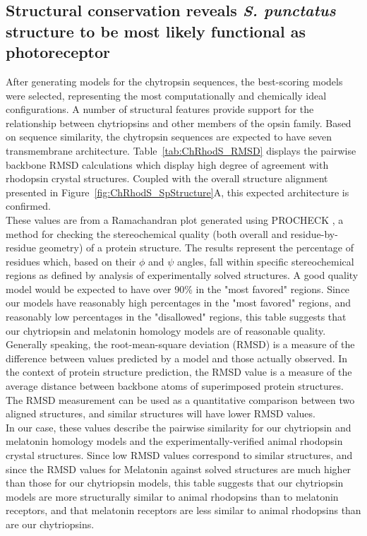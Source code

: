 \subsection*{Structural conservation reveals \textit{S. punctatus} structure to be most likely functional as photoreceptor}
\indent After generating models for the chytropsin sequences, the best-scoring models were selected, representing the most computationally and chemically ideal configurations. A number of structural features provide support for the relationship between chytriopsins and other members of the opsin family. Based on sequence similarity, the chytropsin sequences are expected to have seven transmembrane architecture. Table~\ref{tab:ChRhodS_RMSD} displays the pairwise backbone RMSD calculations which display high degree of agreement with rhodopsin crystal structures. Coupled with the overall structure alignment presented in Figure~\ref{fig:ChRhodS_SpStructure}A, this expected architecture is confirmed. \\
\indent These values are from a Ramachandran plot \cite{Ramachandran1963} generated using PROCHECK \cite{Laskowski1993}, a method for checking the stereochemical quality (both overall and residue-by-residue geometry) of a protein structure. The results represent the percentage of residues which, based on their $\phi$ and $\psi$ angles, fall within specific stereochemical regions as defined by analysis of experimentally solved structures. A good quality model would be expected to have over 90\% in the "most favored" regions. Since our models have reasonably high percentages in the "most favored" regions, and reasonably low percentages in the "disallowed" regions, this table suggests that our chytriopsin and melatonin homology models are of reasonable quality.\\
\indent Generally speaking, the root-mean-square deviation (RMSD) is a measure of the difference between values predicted by a model and those actually observed. In the context of protein structure prediction, the RMSD value is a measure of the average distance between backbone atoms of superimposed protein structures. The RMSD measurement can be used as a quantitative comparison between two aligned structures, and similar structures will have lower RMSD values. \\
\indent In our case, these values describe the pairwise similarity for our chytriopsin and melatonin homology models and the experimentally-verified animal rhodopsin crystal structures. Since low RMSD values correspond to similar structures, and since the RMSD values for Melatonin against solved structures are much higher than those for our chytriopsin models, this table suggests that our chytriopsin models are more structurally similar to animal rhodopsins than to melatonin receptors, and that melatonin receptors are less similar to animal rhodopsins than are our chytriopsins.\\

